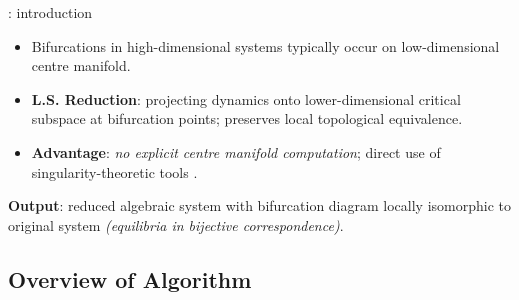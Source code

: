 \documentclass[11pt]{beamer}
\begin{document}
\begin{frame}{\LSR{}: introduction}
    \begin{block}{\LSR{}}
        \begin{itemize}
            \item Bifurcations in high-dimensional systems typically occur on low-dimensional \alert{centre manifold}.
            \item \textbf{L.S. Reduction}: projecting dynamics onto lower-dimensional critical subspace at bifurcation points; \alert{preserves local topological equivalence}.
            \item \textbf{Advantage}: \emph{no explicit centre manifold computation}; direct use of singularity-theoretic tools \cite{Golubitsky1985}.
        \end{itemize}
    \end{block}

    \vspace{4mm} \pause

    \textbf{Output}: reduced algebraic system with bifurcation diagram \alert{locally isomorphic} to original system \emph{(equilibria in bijective correspondence)}.
\end{frame}

\subsection{Overview of Algorithm}
\end{document}
